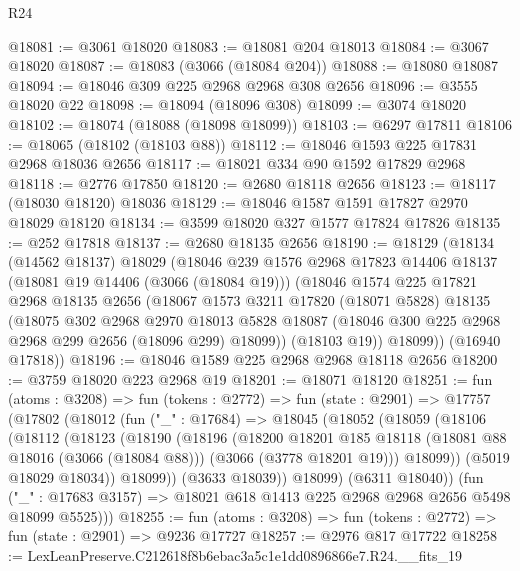 \begin{lexlean}{R24}
\begin{coremodule}
@18081 := @3061 @18020
@18083 := @18081 @204 @18013
@18084 := @3067 @18020
@18087 := @18083 (@3066 (@18084 @204))
@18088 := @18080 @18087
@18094 := @18046 @309 @225 @2968 @2968 @308 @2656
@18096 := @3555 @18020 @22
@18098 := @18094 (@18096 @308)
@18099 := @3074 @18020
@18102 := @18074 (@18088 (@18098 @18099))
@18103 := @6297 @17811
@18106 := @18065 (@18102 (@18103 @88))
@18112 := @18046 @1593 @225 @17831 @2968 @18036 @2656
@18117 := @18021 @334 @90 @1592 @17829 @2968
@18118 := @2776 @17850
@18120 := @2680 @18118 @2656
@18123 := @18117 (@18030 @18120) @18036
@18129 := @18046 @1587 @1591 @17827 @2970 @18029 @18120
@18134 := @3599 @18020 @327 @1577 @17824 @17826
@18135 := @252 @17818
@18137 := @2680 @18135 @2656
@18190 := @18129
    (@18134
      (@14562 @18137)
      @18029
      (@18046
        @239
        @1576
        @2968
        @17823
        @14406
        @18137
        (@18081 @19 @14406 (@3066 (@18084 @19)))
        (@18046
          @1574
          @225
          @17821
          @2968
          @18135
          @2656
          (@18067
            @1573
            @3211
            @17820
            (@18071 @5828)
            @18135
            (@18075
              @302
              @2968
              @2970
              @18013
              @5828
              @18087
              (@18046 @300 @225 @2968 @2968 @299 @2656 (@18096 @299) @18099))
            (@18103 @19))
          @18099))
      (@16940 @17818))
@18196 := @18046 @1589 @225 @2968 @2968 @18118 @2656
@18200 := @3759 @18020 @223 @2968 @19
@18201 := @18071 @18120
@18251 := fun (atoms : @3208) =>
  fun (tokens : @2772) =>
  fun (state : @2901) =>
  @17757
    (@17802
      (@18012
        (fun ("_" : @17684) =>
        @18045
          (@18052
            (@18059
              (@18106
                (@18112
                  (@18123
                    (@18190
                      (@18196
                        (@18200
                          @18201
                          @185
                          @18118
                          (@18081 @88 @18016 (@3066 (@18084 @88)))
                          (@3066 (@3778 @18201 @19)))
                        @18099))
                    (@5019 @18029 @18034))
                  @18099))
              (@3633 @18039))
            @18099)
          (@6311 @18040))
        (fun ("_" : @17683 @3157) => @18021 @618 @1413 @225 @2968 @2968 @2656 @5498 @18099 @5525)))
@18255 := fun (atoms : @3208) => fun (tokens : @2772) => fun (state : @2901) => @9236 @17727
@18257 := @2976 @817 @17722
@18258 := LexLeanPreserve.C212618f8b6ebac3a5c1e1dd0896866e7.R24.__fits_19

\end{coremodule}
\end{lexlean}
